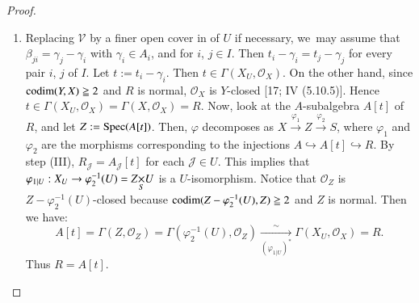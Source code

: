 \begin{proof}
\begin{enumerate}
\item Replacing $\mathscr{V}$ by a finer open cover in of $U$ if
  necessary, we\pageoriginale\ may assume that
  $\beta_{ji}=\gamma_{j}-\gamma_{i}$ with $\gamma_{i}\in A_{i}$, and
  for $i$, $j\in I$. Then $t_{i}-\gamma_{i}=t_{j}-\gamma_{j}$ for
  every pair $i$, $j$ of $I$. Let $t:=t_{i}-\gamma_{i}$. Then
  $t\in\Gamma(X_{U},\mathscr{O}_{X})$. On the other hand, since
  $\operatorname{codim}(Y,X)\geqq 2$ and $R$ is normal, $\mathscr{O}_{X}$ is
  $Y$-closed [17; IV (5.10.5)]. Hence $t\in
  \Gamma(X_{U},\mathscr{O}_{X})=\Gamma(X,\mathscr{O}_{X})=R$. Now,
  look at the $A$-subalgebra $A[t]$ of $R$, and let
  $Z:=\operatorname{Spec}(A[t])$. Then, $\varphi$ decomposes as
  $X\xrightarrow{\varphi_{1}}Z\xrightarrow{\varphi_{2}}S$, where
  $\varphi_{1}$ and $\varphi_{2}$ are the morphisms corresponding to
  the injections $A\hookrightarrow A[t]\hookrightarrow R$. By step
  (III), $R_{\mathscr{J}}=A_{\mathscr{J}}[t]$ for each $\mathscr{J}\in
  U$. This implies that $\varphi_{1|U}:X_{U}\to
  \varphi^{-1}_{2}(U)=\fprod{Z}{U}{S}$ is a $U$-isomorphism. Notice
  that $\mathscr{O}_{Z}$ is $Z-\varphi^{-1}_{2}(U)$-closed because
  $\operatorname{codim}(Z-\varphi^{-1}_{2}(U),Z)\geqq 2$ and $Z$ is normal. Then we
  have: 
$$
A[t]=\Gamma(Z,\mathscr{O}_{Z})=\Gamma(\varphi^{-1}_{2}(U),\mathscr{O}_{Z})\xrightarrow[(\varphi_{1|U})^{\ast}]{\sim}\Gamma(X_{U},\mathscr{O}_{X})=R. 
$$
Thus $R=A[t]$.
\end{enumerate}
\end{proof}



